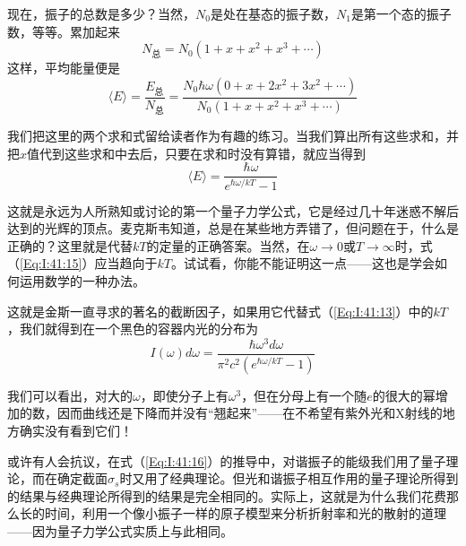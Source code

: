 现在，振子的总数是多少？当然，$N_0$是处在基态的振子数，$N_1$是第一个态的振子数，等等。累加起来
\begin{equation*}
    N_\text{总} = N_0(1 + x + x^2 + x^3 + \cdots)
\end{equation*}
这样，平均能量便是
\begin{equation}
    \label{Eq:I:41:14}
    \langle E \rangle = \frac{E_\text{总}}{N_\text{总}} = \frac{N_0\hbar\omega(0 + x + 2x^2 + 3x^2 + \cdots)}{N_0(1 + x + x^2 + x^3 + \cdots)}
\end{equation}

我们把这里的两个求和式留给读者作为有趣的练习。当我们算出所有这些求和，并把$x$值代到这些求和中去后，只要在求和时没有算错，就应当得到
\begin{equation}
    \label{Eq:I:41:15}
    \langle E \rangle = \frac{\hbar\omega}{e^{\hbar\omega/kT} - 1}
\end{equation}

这就是永远为人所熟知或讨论的第一个量子力学公式，它是经过几十年迷惑不解后达到的光辉的顶点。麦克斯韦知道，总是在某些地方弄错了，但问题在于，什么是正确的？这里就是代替$kT$的定量的正确答案。当然，在$\omega \to 0$或$T \to \infty$时，式（\ref{Eq:I:41:15}）应当趋向于$kT$。试试看，你能不能证明这一点——这也是学会如何运用数学的一种办法。

这就是金斯一直寻求的著名的截断因子，如果用它代替式（\ref{Eq:I:41:13}）中的$kT$，我们就得到在一个黑色的容器内光的分布为
\begin{equation}
    \label{Eq:I:41:16}
    I(\omega)d\omega = \frac{\hbar\omega^3d\omega}{\pi^2c^2(e^{\hbar\omega/kT} - 1)}
\end{equation}

我们可以看出，对大的$\omega$，即使分子上有$\omega^3$，但在分母上有一个随$e$的很大的幂增加的数，因而曲线还是下降而并没有“翘起来”——在不希望有紫外光和X射线的地方确实没有看到它们！

或许有人会抗议，在式（\ref{Eq:I:41:16}）的推导中，对谐振子的能级我们用了量子理论，而在确定截面$\sigma_s$时又用了经典理论。但光和谐振子相互作用的量子理论所得到的结果与经典理论所得到的结果是完全相同的。实际上，这就是为什么我们花费那么长的时间，利用一个像小振子一样的原子模型来分析折射率和光的散射的道理——因为量子力学公式实质上与此相同。

